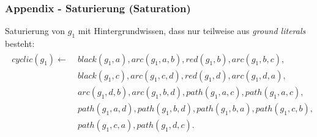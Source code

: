 \begin{frame}
	\frametitle{Appendix - Saturierung (Saturation)}
	Saturierung von $g_1$ mit Hintergrundwissen, dass nur teilweise
	aus \textit{ground literals} besteht:
	\begin{align*}
		\begin{split}
		cyclic(g_1) \leftarrow &\;
		black(g_1, a) , arc(g_1, a, b), red(g_1, b)   , arc(g_1, b, c),\\
		&\;black(g_1, c) , arc(g_1, c, d), red(g_1, d) , arc(g_1, d, a),\\
		&\;arc(g_1, d, b), arc(g_1, b, d), path(g_1, a, c) ,path(g_1, a, c),\\
		&\;path(g_1, a, d) ,path(g_1, b, d) ,path(g_1, b, a) ,path(g_1, c, b),\\
		&\;path(g_1, c, a) ,path(g_1, d, c).
		\end{split}
	\end{align*}
\end{frame}
